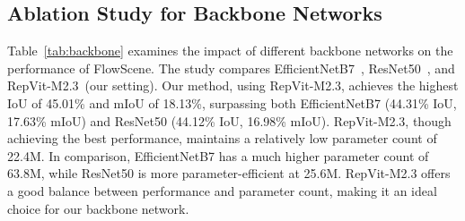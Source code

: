 \subsection{Ablation Study for Backbone Networks}
Table~\ref{tab:backbone} examines the impact of different backbone networks on the performance of FlowScene. The study compares EfficientNetB7~\cite{tan2019efficientnet}, ResNet50~\cite{he2016resnet}, and RepVit-M2.3~\cite{wang2023repvit}(our setting). Our method, using RepVit-M2.3, achieves the highest IoU of 45.01\% and mIoU of 18.13\%, surpassing both EfficientNetB7 (44.31\% IoU, 17.63\% mIoU) and ResNet50 (44.12\% IoU, 16.98\% mIoU). RepVit-M2.3, though achieving the best performance, maintains a relatively low parameter count of 22.4M. In comparison, EfficientNetB7 has a much higher parameter count of 63.8M, while ResNet50 is more parameter-efficient at 25.6M. RepVit-M2.3 offers a good balance between performance and parameter count, making it an ideal choice for our backbone network.
\begin{table}[t]
  \centering\small
{}
      \caption{Ablation study for optical flow networks.}
  \label{tab:flow}
\end{table}
\begin{table}[t]
  \centering\small
{}
      \caption{Ablation study for backbone networks.}
  \label{tab:backbone}
\end{table}
